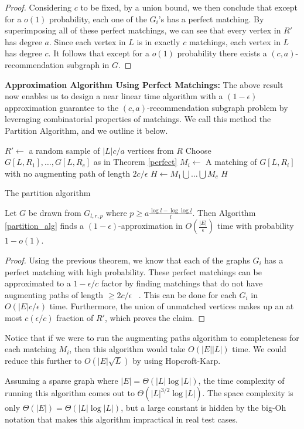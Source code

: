 \begin{proof}
Considering $c$ to be fixed, by a union bound, we then conclude that except
for a $o(1)$ probability, each one of the $G_i$'s has a perfect matching. By
superimposing all of these perfect matchings, we can see that every vertex in
$R'$ has degree $a$. Since each vertex in $L$ is in exactly $c$ matchings, each
vertex in $L$ has degree $c$. It follows that except for a $o(1)$ probability
there exists a $(c,a)$-recommendation subgraph in $G$.
\end{proof}

\vs

{\bf Approximation Algorithm Using Perfect Matchings:}
The above result now enables us to design a near linear time
algorithm with a $(1-\epsilon)$ approximation guarantee
to the $(c,a)$-recommendation subgraph problem by leveraging
combinatorial properties of matchings. We call this method
the Partition Algorithm, and we outline it below.

\begin{algorithm}[h]\label{partition_alg}
  \SetAlgoLined
  $R' \leftarrow$ a random sample of $|L|c/a$ vertices from $R$\;
  Choose $G[L,R_1],\ldots,G[L,R_c]$ as in Theorem \ref{perfect}\;
   {
    $M_i \leftarrow$ A matching of $G[L,R_i]$ with no augmenting path of length $2c/\epsilon$\;
  }
  $H \leftarrow M_1\bigcup\ldots \bigcup M_c$\;
  \Return $H$\;
  \caption{The partition algorithm}
\end{algorithm}\vs

\begin{thm}
Let $G$ be drawn from $G_{l,r,p}$ where $p \geq a\frac{\log l - \log\log l}{l}$.
Then Algorithm \ref{partition_alg} finds a $(1-\epsilon)$-approximation
in $O(\frac{|E|}{\epsilon})$ time with probability $1-o(1)$.
\end{thm}
\begin{proof}
Using the previous theorem, we know that each of the graphs $G_i$ has a
perfect matching with high probability. These perfect matchings
can be approximated to a $1-\epsilon/c$ factor by finding matchings
that do not have augmenting paths of length $\geq 2c/\epsilon$
~\cite{LovaszPlummer1986}. This can be done for each $G_i$ in
$O(|E|c/\epsilon)$ time. Furthermore, the union of unmatched vertices
makes up an at most $c(\epsilon/c)$ fraction of $R'$, which proves the claim.
\end{proof}

Notice that if we were to run the augmenting paths algorithm to completeness
for each matching $M_i$, then this algorithm would take $O(|E||L|)$ time. We
could reduce this further to $O(|E|\sqrt{L})$ by using Hopcroft-Karp.
\cite{HopcroftKarp} \vs

Assuming
a sparse graph where $|E|=\Theta(|L|\log|L|)$, the time complexity of running
this algorithm comes out to $\Theta(|L|^{3/2}\log|L|)$.  The space complexity
is only $\Theta(|E|) = \Theta(|L|\log|L|)$, but a large constant is hidden by
the big-Oh notation that makes this algorithm impractical in real test cases. 